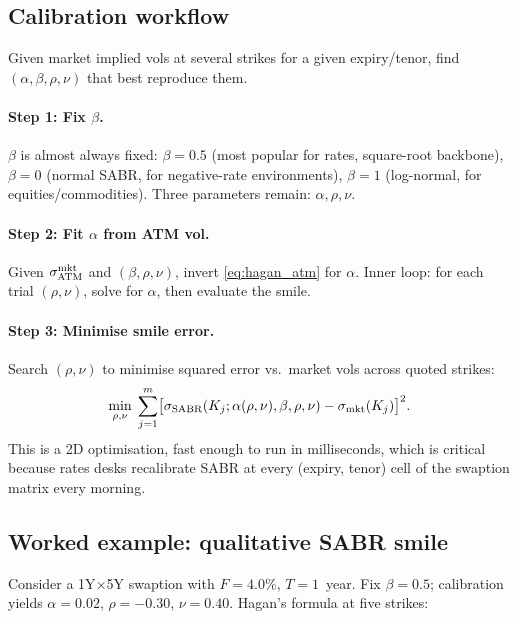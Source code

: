 \subsection{Calibration workflow}
\label{sec:sabr_calib}

Given market implied vols at several strikes for a given expiry/tenor,
find $(\alpha, \beta, \rho, \nu)$ that best reproduce them.

\paragraph{Step 1: Fix $\beta$.}
$\beta$ is almost always fixed: $\beta=0.5$ (most popular for rates,
square-root backbone), $\beta=0$ (normal SABR, for negative-rate
environments), $\beta=1$ (log-normal, for equities/commodities).
Three parameters remain: $\alpha, \rho, \nu$.

\paragraph{Step 2: Fit $\alpha$ from ATM vol.}
Given $\sigma_{\text{ATM}}^{\text{mkt}}$ and $(\beta, \rho, \nu)$,
invert \cref{eq:hagan_atm} for $\alpha$.  Inner loop: for each trial
$(\rho, \nu)$, solve for $\alpha$, then evaluate the smile.

\paragraph{Step 3: Minimise smile error.}
Search $(\rho, \nu)$ to minimise squared error vs.\ market vols across
quoted strikes:
\begin{equation}
  \min_{\rho, \nu}\;\sum_{j=1}^{m}
    \bigl[\sigma_{\text{SABR}}(K_j; \alpha(\rho,\nu), \beta, \rho, \nu)
      - \sigma_{\text{mkt}}(K_j)\bigr]^2.
  \label{eq:sabr_calib_obj}
\end{equation}
This is a 2D optimisation, fast enough to run in milliseconds, which
is critical because rates desks recalibrate SABR at every (expiry,
tenor) cell of the swaption matrix every morning.

\subsection{Worked example: qualitative SABR smile}
\label{sec:sabr_worked}

Consider a 1Y$\times$5Y swaption with $F = 4.0\%$, $T = 1$~year.  Fix
$\beta = 0.5$; calibration yields $\alpha = 0.02$, $\rho = -0.30$,
$\nu = 0.40$.  Hagan's formula at five strikes:

